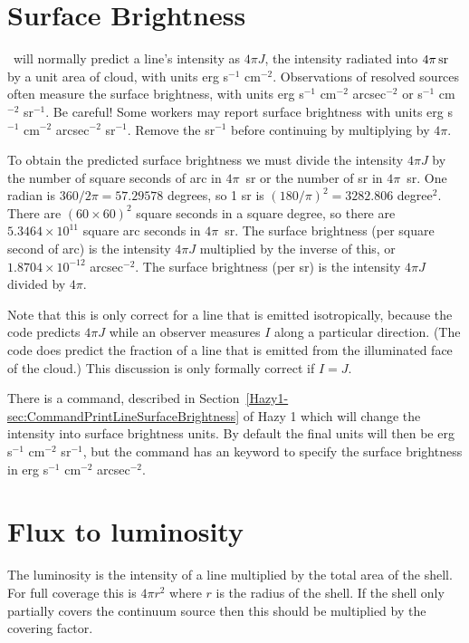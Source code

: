\section{Surface Brightness}

\Cloudy\ will normally predict a line's intensity as $4\pi J$,
the intensity
radiated into $4\pi {\rm\thinspace sr}$ by a unit area of cloud,
with units erg s$^{-1}$ cm$^{-2}$.
Observations of resolved sources often measure
the surface brightness, with
units erg s$^{-1}$ cm$^{-2}$ arcsec$^{-2}$ or
s$^{-1}$ cm$^{-2}$ sr$^{-1}$.
Be careful!  Some workers may report surface
brightness with units erg s$^{-1}$ cm$^{-2}$ arcsec$^{-2}$ sr$^{-1}$.
Remove the sr$^{-1}$ before
continuing by multiplying by $4\pi$.

To obtain the predicted surface brightness we must divide the intensity
$4\pi J$ by the number of square seconds of arc in $4\pi$~sr or the
number of sr in $4\pi$~sr.
One radian is $360/2\pi = 57.29578$ degrees,
so 1 sr is $(180/\pi)^2= 3282.806$ degree$^2$.
There are ${\left( {60 \times 60} \right)^2}$
square seconds in a square degree,
so there are $5.3464\times 10^{11}$ square arc
seconds in $4\pi$~sr.
The surface brightness (per square second of arc) is
the intensity $4\pi J$ multiplied by the inverse of this,
or $1.8704\times 10^{-12}$ arcsec$^{-2}$.
The surface brightness (per sr) is the intensity $4\pi J$ divided by $4 \pi$.

Note that this is only correct for a line that is emitted isotropically,
because the code predicts $4\pi J$ while an observer measures
$I$ along a particular direction.
(The code does predict the fraction of a line that is emitted
from the illuminated face of the cloud.)
This discussion is only formally
correct if $I = J$.

There is a
 command, 
described in 
Section~\ref{Hazy1-sec:CommandPrintLineSurfaceBrightness} 
of Hazy 1 which will change the intensity into
surface brightness units.
By default the final units will then be erg s$^{-1}$ cm$^{-2}$ sr$^{-1}$,
but the command has an  keyword to specify the surface brightness
in erg s$^{-1}$ cm$^{-2}$ arcsec$^{-2}$.

\section{Flux to luminosity}

The luminosity is the intensity of a line multiplied by the total area
of the shell.
For full coverage this is $4\pi r^2$ where $r$ is the radius of the shell.
If the shell only partially covers the continuum source then this
should be multiplied by the covering factor.

